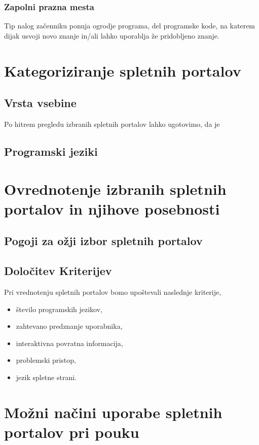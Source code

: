 \subsubsection{Zapolni prazna mesta}
\label{sec:zapolni_prazna_mesta}

Tip nalog začenniku ponuja ogrodje programa, del programske kode, na
katerem dijak usvoji novo znanje in/ali lahko uporablja že pridobljeno
znanje.


\section{Kategoriziranje spletnih portalov}
\label{sec:kategoriziranje_spletnih_portalov}

\subsection{Vrsta vsebine}
\label{sec:Razvrstitev_spletnih_portalov}

Po hitrem pregledu izbranih spletnih portalov lahko ugotovimo, da je

\subsection{Programski jeziki}
\label{sec:programski_jeziki}


\section{Ovrednotenje izbranih spletnih portalov in njihove posebnosti}
\label{sec:pregled_spletnih_portalov}

\subsection{Pogoji za ožji izbor spletnih portalov}
\label{sec:pogoji_za_ožji_izbor_sp}



\subsection{Določitev Kriterijev}
\label{sec:dolocitev_kriterijev}

Pri vrednotenju spletnih portalov bomo upoštevali naslednje
kriterije,


\begin{itemize}
\item število programskih jezikov,
\item zahtevano predznanje uporabnika,
\item interaktivna povratna informacija,
\item problemski pristop,
\item jezik spletne strani.
\end{itemize}

\section{Možni načini uporabe spletnih portalov pri pouku}
\label{sec:načini_uporabe_sp}
